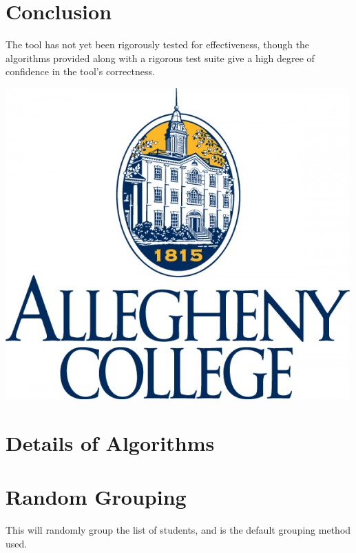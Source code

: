 \documentclass[a0paper,fleqn]{betterposter}
\begin{document}
{\section{Conclusion}
The tool has not yet been rigorously tested for effectiveness, though the
algorithms provided along with a rigorous test suite give a high degree of
confidence in the tool's correctness.

\vfill

\includegraphics[width=\textwidth]{img/aclogo.jpg}\\

}{

\section{\textbf{Details of Algorithms}}

\section{Random Grouping}
This will randomly group the list of students, and is the default grouping method
used.

}
\end{document}
